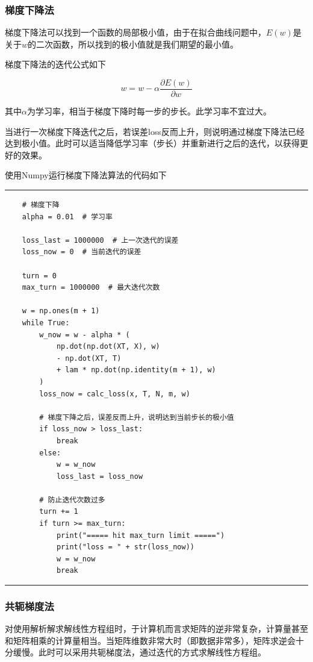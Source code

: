 \subsubsection{梯度下降法}

梯度下降法可以找到一个函数的局部极小值，由于在拟合曲线问题中，$E(w)$是关于$w$的二次函数，所以找到的极小值就是我们期望的最小值。

梯度下降法的迭代公式如下

\begin{equation}
    w = w - \alpha \frac{\partial E(w)}{\partial w}
\end{equation}

其中$\alpha$为学习率，相当于梯度下降时每一步的步长。此学习率不宜过大。

当进行一次梯度下降迭代之后，若误差loss反而上升，则说明通过梯度下降法已经达到极小值。此时可以适当降低学习率（步长）并重新进行之后的迭代，以获得更好的效果。

使用Numpy运行梯度下降法算法的代码如下

\rule{\textwidth}{0.01em}
\begin{verbatim}
    # 梯度下降
    alpha = 0.01  # 学习率

    loss_last = 1000000  # 上一次迭代的误差
    loss_now = 0  # 当前迭代的误差

    turn = 0
    max_turn = 1000000  # 最大迭代次数

    w = np.ones(m + 1)
    while True:
        w_now = w - alpha * (
            np.dot(np.dot(XT, X), w)
            - np.dot(XT, T)
            + lam * np.dot(np.identity(m + 1), w)
        )
        loss_now = calc_loss(x, T, N, m, w)

        # 梯度下降之后，误差反而上升，说明达到当前步长的极小值
        if loss_now > loss_last:
            break
        else:
            w = w_now
            loss_last = loss_now

        # 防止迭代次数过多
        turn += 1
        if turn >= max_turn:
            print("===== hit max_turn limit =====")
            print("loss = " + str(loss_now))
            w = w_now
            break
\end{verbatim}
\rule{\textwidth}{0.01em}

\subsubsection{共轭梯度法}

对使用解析解求解线性方程组时，于计算机而言求矩阵的逆非常复杂，计算量甚至和矩阵相乘的计算量相当\cite{ref1}。当矩阵维数非常大时（即数据非常多），矩阵求逆会十分缓慢。此时可以采用共轭梯度法，通过迭代的方式求解线性方程组。


